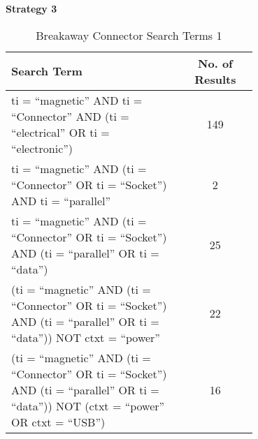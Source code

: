 \documentclass [12pt]{article}
\begin{document}
\textbf{Strategy 3}
\begin{table}[H]
    \centering
    \setlength{\arrayrulewidth}{1.5pt}
    \begin{tabular}{|p{0.7\linewidth}|c|}
    \hline
    \cellcolor{gray!40}Search Term & \cellcolor{gray!40}No. of Results \\
    \hline
    ti = “magnetic” AND ti = “Connector” AND (ti = “electrical” OR ti = “electronic”) & 149 \\
    \hline
    ti = “magnetic” AND (ti = “Connector” OR ti = “Socket”) AND ti = “parallel” & 2 \\
    \hline
    ti = “magnetic” AND (ti = “Connector” OR ti = “Socket”) AND (ti = “parallel” OR ti = “data”) & 25 \\
    \hline
    (ti = “magnetic” AND (ti = “Connector” OR ti = “Socket”) AND (ti = “parallel” OR ti = “data”)) NOT ctxt = “power” & 22 \\
    \hline
    (ti = “magnetic” AND (ti = “Connector” OR ti = “Socket”) AND (ti = “parallel” OR ti = “data”)) NOT (ctxt = “power” OR ctxt = “USB”) & 16\\
    \hline
    \end{tabular}
    \caption{Breakaway Connector Search Terms 1}
    \label{table:breakaway_connector_search_strat_3}
\end{table}
\end{document}
